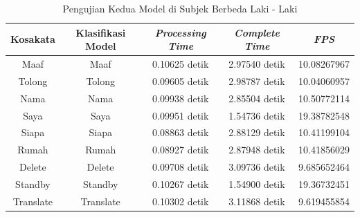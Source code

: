 \begin{longtable}{|c|c|c|c|c|}
  \caption{Pengujian Kedua Model di Subjek Berbeda Laki - Laki}
  \label{tb:prediksilaki2}                                   \\
  \hline
  \rowcolor[HTML]{C0C0C0}
  \textbf{Kosakata} & \textbf{Klasifikasi Model} & \textbf{\emph{Processing Time}} & \textbf{\emph{Complete Time}} & \textbf{\emph{FPS}}\\
  \hline
  Maaf              & Maaf                          & 0.10625 detik                           & 2.97540 detik                                  & 10.08267967\\
  Tolong            & Tolong                        & 0.09605 detik                           & 2.98787 detik                                  & 10.04060957\\
  Nama              & Nama                          & 0.09938 detik                           & 2.85504 detik                                  & 10.50772114\\
  Saya              & Saya                          & 0.09951 detik                           & 1.54736 detik                                  & 19.38782548\\
  Siapa             & Siapa                         & 0.08863 detik                           & 2.88129 detik                                  & 10.41199104\\
  Rumah             & Rumah                         & 0.08927 detik                           & 2.87948 detik                                  & 10.41856029\\
  Delete            & Delete                        & 0.09708 detik                           & 3.09736 detik                                  & 9.685652464\\
  Standby           & Standby                       & 0.10267 detik                           & 1.54900 detik                                  & 19.36732451\\
  Translate         & Translate                     & 0.10302 detik                           & 3.11868 detik                                  & 9.619455854\\
  \hline
\end{longtable}


